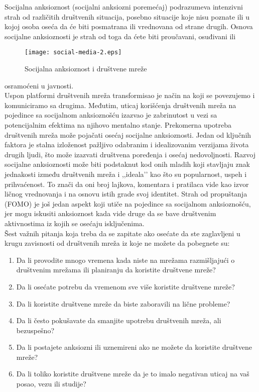 \documentclass[a4paper]{article}
\begin{document}
	         Socijalna anksioznost (socijalni anksiozni poremećaj) podrazumeva intenzivni strah od različitih društvenih situacija, posebno situacije koje nisu poznate ili u kojoj osoba oseća da će biti posmatrana ili vrednovana od strane drugih. Osnova socijalne anksioznosti je strah od
              toga da ćete biti proučavani, osuđivani ili 	\begin{figure}[h]
            \caption{Socijalna anksioznost i društvene mreže}
            \centering
            \texttt{[image: social-media-2.eps]}
            \end{figure} osramoćeni u javnosti. \\ 
    
            Uspon platformi društvenih mreža transformisao je način na koji se povezujemo i komuniciramo sa drugima. Međutim, uticaj korišćenja društvenih mreža na pojedince sa socijalnom anksioznošću izazvao je zabrinutost u vezi sa potencijalnim efektima na njihovo mentalno stanje. Prekomerna upotreba društvenih mreža može pojačati osećaj socijalne anksioznosti. Jedan od ključnih faktora je stalna izloženost pažljivo odabranim i idealizovanim verzijama života drugih ljudi, što može izazvati društvena poređenja i osećaj nedovoljnosti. Razvoj socijalne anksioznosti može biti podstaknut kod onih mladih koji stavljaju znak jednakosti između društvenih mreža i ,,ideala’’ kao što su popularnost, uspeh i prihvaćenost. To znači da oni broj lajkova, komentara i pratilaca vide kao izvor ličnog vrednovanja i na osnovu istih grade svoj identitet. Strah od propuštanja (FOMO) je još jedan aspekt koji utiče na pojedince sa socijalnom anksioznošću, jer mogu iskusiti anksioznost kada vide druge da se bave društvenim aktivnostima iz kojih se osećaju isključenima. \\
        
            Šest važnih pitanja koja treba da se zapitate ako osećate da ste zaglavljeni u krugu zavisnosti od društvenih mreža iz koje ne možete da pobegnete su:
    		\begin{enumerate}
			\item
			Da li provodite mnogo vremena kada niste na mrežama razmišljajući o društvenim mrežama ili planiranju da koristite društvene mreže?
			\item
			Da li osećate potrebu da vremenom sve više koristite društvene mreže?
			\item
			Da li koristite društvene mreže da biste zaboravili na lične probleme?
			\item
			Da li često pokušavate da smanjite upotrebu društvenih mreža, ali bezuspešno?

			\item
			Da li postajete anksiozni ili uznemireni ako ne možete da koristite društvene mreže?
			\item
			Da li toliko koristite društvene mreže da je to imalo negativan uticaj na vaš posao, vezu ili studije?
			
		\end{enumerate}
\end{document}
